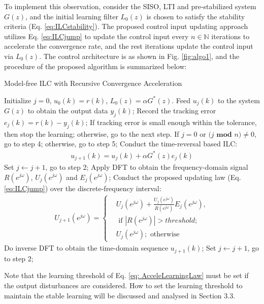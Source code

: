 \documentclass[a4paper, 12pt, twoside, openright]{mythesis}
\begin{document}
To implement this observation, consider the SISO, LTI and pre-stabilized system $G(z)$, and the initial learning filter $L_0(z)$ is chosen to satisfy the stability criteria (Eq. \ref{eq:ILCstability}). The proposed control input updating approach utilizes Eq. \ref{eq:ILCjump} to update the control input every $n\in\mathbb{N}$ iterations to accelerate the convergence rate, and the rest iterations update the control input via $L_0(z)$.  The control architecture is as shown in Fig. \ref{fig:algo1}, and the procedure of the proposed algorithm is summarized below:

\begin{algorithm}[htbp]
 \caption{Model-free ILC with Recursive Convergence Acceleration}
  \label{alg:Framwork}
  \begin{algorithmic}[1]
    \State Initialize $j=0$, $u_0(k)=r(k)$, $L_0(z)=\alpha G^{*}(z)$.
	\State Feed $u_j(k)$ to the system $G(z)$ to obtain the output data $y_j(k)$; Record the tracking error $e_j(k)=r(k)-y_j(k)$;
	If tracking error is small enough within the tolerance, then stop the learning;
	otherwise, go to the next step.
	\State If $j=0$ or $(j$ $\bm{mod}$ $n)\neq0$, go to step 4; otherwise, go to step 5;
	\State Conduct the time-reversal based ILC:
	 \begin{align}
	 u_{j+1}(k)=u_j(k)+\alpha G^{*}(z)e_{j} (k)
	 \end{align}
	 Set $j\leftarrow j+1$, go to step 2;
    \State Apply DFT to obtain the frequency-domain signal $R(e^{j\omega})$, $U_{j}(e^{j\omega})$ and $E_{j}(e^{j\omega})$;	
	\State Conduct the proposed updating law (Eq. \ref{eq:ILCjump}) over the discrete-frequency interval:
	 \begin{align}
U_{j+1}(e^{j\omega})=\begin{cases}
 & U_{j}(e^{j\omega})+\frac{U_j(e^{j\omega})}{R(e^{j\omega})}E_j(e^{j\omega}),\\ 
 &\text{ if } |R(e^{j\omega})|> threshold ;\\ 
 & U_{j}(e^{j\omega});\text{ otherwise}
\end{cases}
\label{eq: AcceleLearningLaw}
\end{align}
     Do inverse DFT to obtain the time-domain sequence $u_{j+1}(k)$;	 
	 Set $j\leftarrow j+1$, go to step 2;
	
  \end{algorithmic}
\end{algorithm}

Note that the learning threshold of Eq. \ref{eq: AcceleLearningLaw} must be set if the output disturbances are considered. How to set the learning threshold to maintain the stable learning will be discussed and analysed in Section 3.3.
\end{document}
